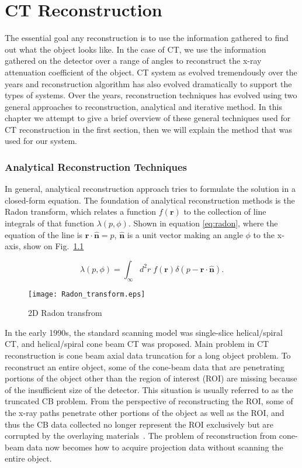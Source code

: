 \chapter{CT Reconstruction}
\label{chap:reconstruction}

The essential goal any reconstruction is to use the information gathered to find out what the object looks like.  In the case of CT, we use the information gathered on the detector over a range of angles to reconstruct the x-ray attenuation coefficient of the object.  CT system as evolved tremendously over the years and reconstruction algorithm has also evolved dramatically to support the types of systems. Over the years, reconstruction techniques has evolved using two general approaches to reconstruction, analytical and iterative method.  In this chapter we attempt to give a brief overview of these general techniques used for CT reconstruction in the first section, then we will explain the method that was used for our system.

\subsection{Analytical Reconstruction Techniques}
In general, analytical reconstruction approach tries to formulate the solution in a closed-form equation.  The foundation of analytical reconstruction methods is the Radon transform, which relates a function $f(\mathbf{r})$ to the collection of line integrals of that function $\lambda(p, \phi)$.  Shown in equation \ref{eq:radon}, where the equation of the line is $\mathbf{r \cdot \hat{n}} = p$, $\mathbf{\hat{n}}$ is a unit vector making an angle $\phi$ to the x-axis, show on Fig.~\ref{fig:RadonTransform}

\begin{equation}
\lambda(p, \phi) = \int_\infty d^2r \; f(\mathbf{r}) \delta(p- \mathbf{r} \cdot \mathbf{\hat{n}}).
\label{eq:radon}
\end{equation}

\begin{figure}[h]
\centering
\texttt{[image: Radon\_transform.eps]}
\caption{2D Radon transfrom }
\label{fig:RadonTransform}
\end{figure}

In the early 1990s, the standard scanning model was single-slice helical/spiral CT, and helical/spiral cone beam CT was proposed.  Main problem in CT reconstruction is cone beam axial data truncation for a long object problem.  To reconstruct an entire object, some of the cone-beam data that are penetrating portions of the object other than the region of interest (ROI) are missing because of the insufficient size of the detector.  This situation is usually referred to as the truncated CB problem.  From the perspective of reconstructing the ROI, some of the x-ray paths penetrate other portions of the object as well as the ROI, and thus the CB data collected no longer represent the ROI exclusively but are corrupted by the overlaying materials~\citep{Tam1998}.  The problem of reconstruction from cone-beam data now becomes how to acquire projection data without scanning the entire object.  

